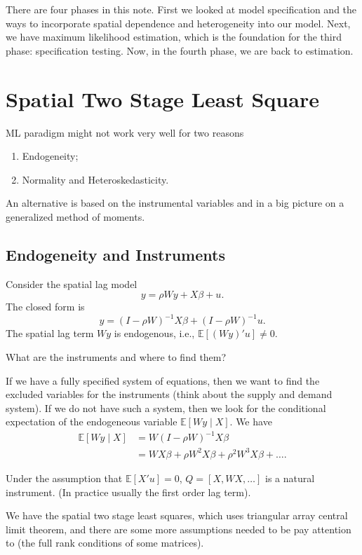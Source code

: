 \documentclass[11pt,a4paper]{amsart}
\theoremstyle{plain}
\theoremstyle{definition}
\begin{document}
There are four phases in this note. First we looked at model specification and the ways to incorporate spatial dependence and heterogeneity into our model. Next, we have maximum likelihood estimation, which is the foundation for the third phase: specification testing. Now, in the fourth phase, we are back to estimation.

\section{Spatial Two Stage Least Square}\hfill\par 
ML paradigm might not work very well for two reasons
\begin{enumerate}
	\item Endogeneity;
	\item  Normality and Heteroskedasticity.
\end{enumerate} 
An alternative is based on the instrumental variables and in a big picture on a generalized method of moments.

\subsection{Endogeneity and Instruments}\hfill\par 
Consider the spatial lag model 
\[	y = \rho W y + X\beta + u.	\]
The closed form is 
\[		y = (I-\rho W)^{-1} X\beta + (I- \rho W)^{-1}u. \]
The spatial lag term $Wy$ is endogenous, i.e., $\mathbb{E}[(Wy)'u] \ne 0$.

What are the instruments and where to find them?

If we have a fully specified system of equations, then we want to find the excluded variables for the instruments (think about the supply and demand system). If we do not have such a system, then we look for the conditional expectation of the endogeneous variable $\mathbb{E}[Wy \mid X]$. We have 
\[	\begin{aligned}
	\mathbb{E}[Wy \mid X] &= W(I-\rho W)^{-1}X\beta \\
	&= WX\beta + \rho W^{2}X\beta + \rho^{2}W^{3}X\beta + \dots.
\end{aligned}	\]

Under the assumption that $\mathbb{E}[X'u] = 0$, $Q = [X, WX, \dots]$ is a natural instrument. (In practice usually the first order lag term). 

We have the spatial two stage least squares, which uses triangular array central limit theorem, and there are some more assumptions needed to be pay attention to (the full rank conditions of some matrices). 
\end{document}
